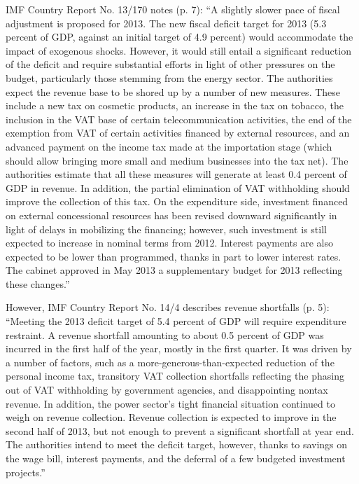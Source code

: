IMF Country Report No. 13/170 notes (p. 7): “A slightly slower pace of fiscal adjustment is proposed for 2013. The new fiscal deficit target for 2013 (5.3 percent of GDP, against an initial target of 4.9 percent) would accommodate the impact of exogenous shocks. However, it would still entail a significant reduction of the deficit and require substantial efforts in light of other pressures on the budget, particularly those stemming from the energy sector. The authorities expect the revenue base to be shored up by a number of new measures. These include a new tax on cosmetic products, an increase in the tax on tobacco, the inclusion in the VAT base of certain telecommunication activities, the end of the exemption from VAT of certain activities financed by external resources, and an advanced payment on the income tax made at the importation stage (which should allow bringing more small and medium businesses into the tax net). The authorities estimate that all these measures will generate at least 0.4 percent of GDP in revenue. In addition, the partial elimination of VAT withholding should improve the collection of this tax. On the expenditure side, investment financed on external concessional resources has been revised downward significantly in light of delays in mobilizing the financing; however, such investment is still expected to increase in nominal terms from 2012. Interest payments are also expected to be lower than programmed, thanks in part to lower interest rates. The cabinet approved in May 2013 a supplementary budget for 2013 reflecting these changes.”

However, IMF Country Report No. 14/4 describes revenue shortfalls (p. 5): “Meeting the 2013 deficit target of 5.4 percent of GDP will require expenditure restraint. A revenue shortfall amounting to about 0.5 percent of GDP was incurred in the first half of the year, mostly in the first quarter. It was driven by a number of factors, such as a more-generous-than-expected reduction of the personal income tax, transitory VAT collection shortfalls reflecting the phasing out of VAT withholding by government agencies, and disappointing nontax revenue. In addition, the power sector’s tight financial situation continued to weigh on revenue collection. Revenue collection is expected to improve in the second half of 2013, but not enough to prevent a significant shortfall at year end. The authorities intend to meet the deficit target, however, thanks to savings on the wage bill, interest payments, and the deferral of a few budgeted investment projects.”

